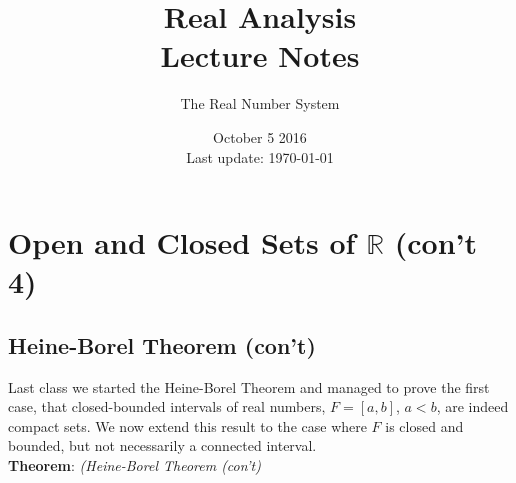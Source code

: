 \documentclass[12pt]{article}
\newlength\tindent
\renewcommand{\indent}{\hspace*{\tindent}}
\newcommand{\R}{\mathbb R}
\begin{document}
 
 
\title{Real Analysis\\Lecture Notes}
\author{The Real Number System}
\date{October 5 2016 \\ Last update: \today{}}
\maketitle

\section{Open and Closed Sets of $\bm{\R}$ (con't 4)}

\subsection{Heine-Borel Theorem (con't)}

\indent Last class we started the Heine-Borel Theorem and managed to prove the first case, that closed-bounded intervals of real numbers, $F = [a,b]$, $a < b$, are indeed compact sets. We now extend this result to the case where $F$ is closed and bounded, but not necessarily a connected interval. \\

%
%
{\bf Theorem}: {\em (Heine-Borel Theorem (con't)} 
\end{document}
